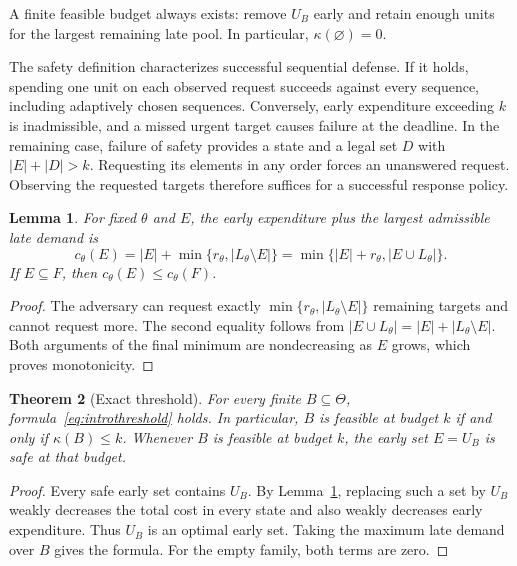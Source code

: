 \documentclass[11pt,a4paper]{amsart}
\newtheorem{theorem}{Theorem}[section]
\newtheorem{lemma}[theorem]{Lemma}
\theoremstyle{definition}
\theoremstyle{remark}
\newcommand{\card}[1]{\lvert #1\rvert}
\begin{document}
A finite feasible budget always exists: remove $U_B$ early and retain
enough units for the largest remaining late pool. In particular,
$\kappa(\varnothing)=0$.

The safety definition characterizes successful sequential defense.
If it holds, spending one unit on each observed request succeeds against
every sequence, including adaptively chosen sequences. Conversely, early
expenditure exceeding $k$ is inadmissible, and a missed urgent target
causes failure at the deadline. In the remaining case, failure of safety
provides a state and a legal set $D$ with $\card E+\card D>k$. Requesting
its elements in any order forces an unanswered request. Observing the
requested targets therefore suffices for a successful response policy.

\begin{lemma}\label{lem:cost}
For fixed $\theta$ and $E$, the early expenditure plus the largest
admissible late demand is
\begin{equation}\label{eq:cost}
 c_\theta(E)=\card E+\min\{r_\theta,\card{L_\theta\setminus E}\}
 =\min\{\card E+r_\theta,\card{E\cup L_\theta}\}.
\end{equation}
If $E\subseteq F$, then $c_\theta(E)\le c_\theta(F)$.
\end{lemma}
\begin{proof}
The adversary can request exactly
$\min\{r_\theta,\card{L_\theta\setminus E}\}$ remaining targets and cannot
request more. The second equality follows from
$\card{E\cup L_\theta}=\card E+\card{L_\theta\setminus E}$.
Both arguments of the final minimum are nondecreasing as $E$ grows,
which proves monotonicity.
\end{proof}

\begin{theorem}[Exact threshold]\label{thm:threshold}
For every finite $B\subseteq\Theta$, formula~\eqref{eq:introthreshold} holds.
In particular, $B$ is feasible at budget $k$ if and only if
$\kappa(B)\le k$.
Whenever $B$ is feasible at budget $k$, the early set $E=U_B$ is safe at
that budget.
\end{theorem}
\begin{proof}
Every safe early set contains $U_B$. By Lemma~\ref{lem:cost}, replacing
such a set by $U_B$ weakly decreases the total cost in every state and
also weakly decreases early expenditure. Thus $U_B$ is an optimal early
set. Taking the maximum late demand over $B$ gives the formula. For the
empty family, both terms are zero.
\end{proof}
\end{document}
